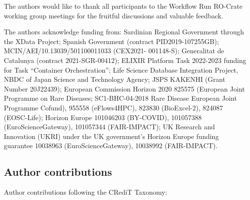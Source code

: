 \documentclass[10pt,letterpaper]{article}
\begin{document}
The authors would like to thank all participants to the Workflow Run
RO-Crate working group meetings for the fruitful discussions and
valuable feedback.

The authors acknowledge funding from: 
  Sardinian Regional Government through the XData Project;
  Spanish Government (contract PID2019-107255GB);
  MCIN/AEI/10.13039/501100011033 (CEX2021- 001148-S);
  Generalitat de Catalunya (contract 2021-SGR-00412);
  ELIXIR Platform Task 2022-2023 funding for Task ``Container
  Orchestration'';
  Life Science Database Integration Project, NBDC of Japan Science and
  Technology Agency;
  JSPS KAKENHI (Grant Number 20J22439);
  European Commission Horizon 2020 
  825575 (European Joint Programme on Rare Diseases; SC1-BHC-04-2018 Rare Disease European Joint Programme Cofund),
  955558 (eFlows4HPC),
  823830
  (BioExcel-2), 
  824087
  (EOSC-Life);
  Horizon Europe 
  101046203 (BY-COVID),
  101057388 (EuroScienceGateway),
  101057344 (FAIR-IMPACT);
  UK Research and Innovation (UKRI) under the UK government's Horizon
  Europe funding guarantee 
  10038963 (EuroScienceGateway), 
  10038992 (FAIR-IMPACT).


\subsection*{Author contributions}
Author contributions following the CRediT Taxonomy:
\end{document}
